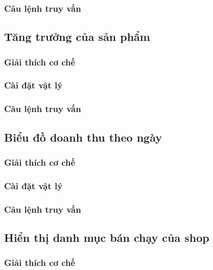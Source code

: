 \subsubsection{Câu lệnh truy vấn}

\subsection{Tăng trưởng của sản phẩm}

\subsubsection{Giải thích cơ chế}

\subsubsection{Cài đặt vật lý}

\subsubsection{Câu lệnh truy vấn}

\subsection{Biểu đồ doanh thu theo ngày}

\subsubsection{Giải thích cơ chế}

\subsubsection{Cài đặt vật lý}

\subsubsection{Câu lệnh truy vấn}

\subsection{Hiển thị danh mục bán chạy của shop}

\subsubsection{Giải thích cơ chế}

